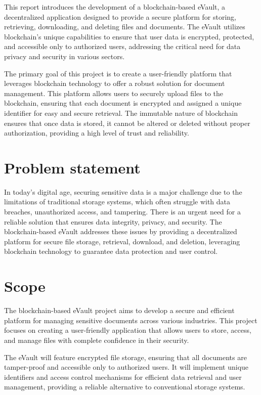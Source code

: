 \documentclass[12pt,a4paper]{report}
\begin{document}
This report introduces the development of a blockchain-based eVault, a decentralized application designed to provide a secure platform for storing, retrieving, downloading, and deleting files and documents. The eVault utilizes blockchain's unique capabilities to ensure that user data is encrypted, protected, and accessible only to authorized users, addressing the critical need for data privacy and security in various sectors.

The primary goal of this project is to create a user-friendly platform that leverages blockchain technology to offer a robust solution for document management. This platform allows users to securely upload files to the blockchain, ensuring that each document is encrypted and assigned a unique identifier for easy and secure retrieval. The immutable nature of blockchain ensures that once data is stored, it cannot be altered or deleted without proper authorization, providing a high level of trust and reliability.


\section{Problem statement }
In today's digital age, securing sensitive data is a major challenge due to the limitations of traditional storage systems, which often struggle with data breaches, unauthorized access, and tampering. There is an urgent need for a reliable solution that ensures data integrity, privacy, and security. The blockchain-based eVault addresses these issues by providing a decentralized platform for secure file storage, retrieval, download, and deletion, leveraging blockchain technology to guarantee data protection and user control.

\section{Scope}
The blockchain-based eVault project aims to develop a secure and efficient platform for managing sensitive documents across various industries. This project focuses on creating a user-friendly application that allows users to store, access, and manage files with complete confidence in their security.

The eVault will feature encrypted file storage, ensuring that all documents are tamper-proof and accessible only to authorized users. It will implement unique identifiers and access control mechanisms for efficient data retrieval and user management, providing a reliable alternative to conventional storage systems.
\end{document}
